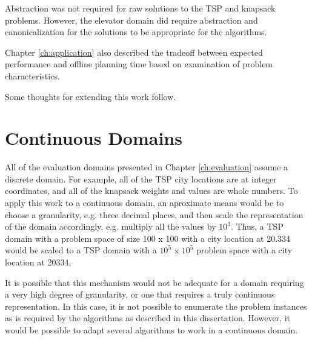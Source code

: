 Abstraction was not required for raw solutions to the TSP and knapsack problems.  However, the elevator domain did require abstraction and canonicalization for the solutions to be appropriate for the algorithms.

Chapter \ref{ch:application} also described the tradeoff between expected performance and offline planning time based on examination of problem characteristics.


Some thoughts for extending this work follow.

\section{Continuous Domains}

All of the evaluation domains presented in Chapter \ref{ch:evaluation} assume a discrete domain.  For example, all of the TSP city locations are at integer coordinates, and all of the knapsack weights and values are whole numbers.  To apply this work to a continuous domain, an aproximate means would be to choose a granularity, e.g. three decimal places, and then scale the representation of the domain accordingly, e.g. multiply all the values by $10^3$.  Thus, a TSP domain with a problem space of size 100 x 100 with a city location at 20.334 would be scaled to a TSP domain with a $10^5$ x $10^5$ problem space with a city location at 20334.

It is possible that this mechanism would not be adequate for a domain requiring a very high degree of granularity, or one that requires a truly continuous representation.  In this case, it is not  possible to enumerate the problem instances as is required by the algorithms as described in this dissertation.  However, it would be possible to adapt several algorithms to work in a continuous domain.

